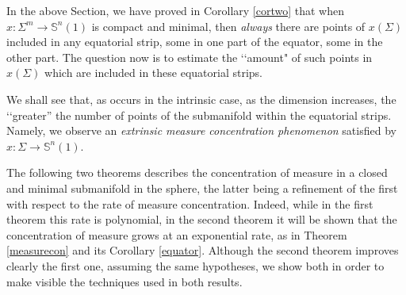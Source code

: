 \documentclass{amsart}
\theoremstyle{definition}
\theoremstyle{remark}
\begin{document}
In the above Section, we have proved in Corollary \ref{cortwo} that when $x: \Sigma^m \to \mathbb{S}^n(1)$ is  compact and minimal, then \emph{always} there are points of $x(\Sigma)$ included in any equatorial strip, some in one part of the equator, some in the other part. The question now is to estimate the \lq\lq amount" of such points in $x(\Sigma)$ which are included in these equatorial strips. 

We shall see that, as occurs in the intrinsic case, as the dimension increases, the \lq\lq greater'' the number of points of the submanifold within the equatorial strips. Namely, we observe an \emph{ extrinsic measure concentration phenomenon} satisfied by $x: \Sigma\to \mathbb{S}^n(1)$.

The following two  theorems describes the concentration of measure in a closed and minimal submanifold in the sphere, the latter being a refinement of the first with respect to the rate of measure concentration. Indeed, while in the first theorem this rate is polynomial, in the second theorem it will be shown that the concentration of measure grows at an exponential rate, as in Theorem \ref{measurecon} and its Corollary \ref{equator}. Although the second theorem improves clearly the first one, assuming the same hypotheses, we show both in order to make visible the techniques used in both results.
\end{document}

